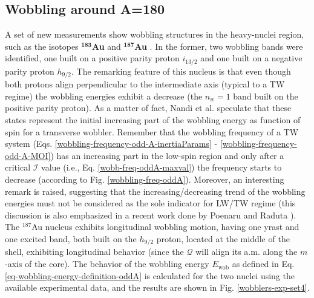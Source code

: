 \subsection{Wobbling around A=180}

A set of new measurements show wobbling structures in the heavy-nuclei region, such as the isotopes $^\mathbf{183}$\textbf{Au} \cite{nandi2020first} and $^\mathbf{187}$\textbf{Au} \cite{sensharma2020longitudinal,sensharma2021wobbling}. In the former, two wobbling bands were identified, one built on a positive parity proton $i_{13/2}$ and one built on a negative parity proton $h_{9/2}$. The remarking feature of this nucleus is that even though both protons align perpendicular to the intermediate axis (typical to a TW regime) the wobbling energies exhibit a decrease (the $n_w=1$ band built on the positive parity proton). As a matter of fact, Nandi et al. speculate that these states represent the initial increasing part of the wobbling energy as function of spin for a transverse wobbler. Remember that the wobbling frequency of a TW system (Eqs. \ref{wobbling-frequency-odd-A-inertiaParams} - \ref{wobbling-frequency-odd-A-MOI}) has an increasing part in the low-spin region and only after a critical $\mathscr{I}$ value (i.e., Eq. \ref{wobb-freq-oddA-maxval}) the frequency starts to decrease (according to Fig. \ref{wobbling-freq-oddA}). Moreover, an interesting remark is raised, suggesting that the increasing/decreasing trend of the wobbling energies must not be considered as the sole indicator for LW/TW regime (this discussion is also emphasized in a recent work done by Poenaru and Raduta \cite{poenaru2021extensive1,poenaru2021extensive2}). The $^{187}$Au nucleus exhibits longitudinal wobbling motion, having one yrast and one excited band, both built on the $h_{9/2}$ proton, located at the middle of the shell, exhibiting longitudinal behavior (since the $\mathcal{Q}$ will align its a.m. along the $m$-axis of the core). The behavior of the wobbling energy $E_\text{wob}$ as defined in Eq. \ref{eq-wobbling-energy-definition-oddA} is calculated for the two nuclei using the available experimental data, and the results are shown in Fig. \ref{wobblers-exp-set4}.
